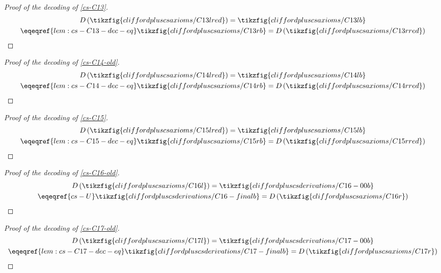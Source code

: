 \begin{proof}[Proof of the decoding of \cref{cs-C13}]
    \begin{gather*}
        D\left(\tikzfig{cliffordpluscsaxioms/C13lred}\right)
        = \tikzfig{cliffordpluscsaxioms/C13lb}\\
        \eqeqref{lem:cs-C13-dec-eq} \tikzfig{cliffordpluscsaxioms/C13rb}
        = D\left(\tikzfig{cliffordpluscsaxioms/C13rred}\right)
    \end{gather*}
\end{proof}

\begin{proof}[Proof of the decoding of \cref{cs-C14-old}]
    \begin{gather*}
        D\left(\tikzfig{cliffordpluscsaxioms/C14lred}\right)
        = \tikzfig{cliffordpluscsaxioms/C14lb}\\
        \eqeqref{lem:cs-C14-dec-eq} \tikzfig{cliffordpluscsaxioms/C14rb}
        = D\left(\tikzfig{cliffordpluscsaxioms/C14rred}\right)
    \end{gather*}
\end{proof}

\begin{proof}[Proof of the decoding of \cref{cs-C15}]
    \begin{gather*}
        D\left(\tikzfig{cliffordpluscsaxioms/C15lred}\right)
        = \tikzfig{cliffordpluscsaxioms/C15lb}\\
        \eqeqref{lem:cs-C15-dec-eq} \tikzfig{cliffordpluscsaxioms/C15rb}
        = D\left(\tikzfig{cliffordpluscsaxioms/C15rred}\right)
    \end{gather*}
\end{proof}

\begin{proof}[Proof of the decoding of \cref{cs-C16-old}]
    \begin{gather*}
        D\left(\tikzfig{cliffordpluscsaxioms/C16l}\right)
        = \tikzfig{cliffordpluscsderivations/C16-00b}\\
        \eqeqref{cs-U} \tikzfig{cliffordpluscsderivations/C16-finalb}
        = D\left(\tikzfig{cliffordpluscsaxioms/C16r}\right)
    \end{gather*}
\end{proof}

\begin{proof}[Proof of the decoding of \cref{cs-C17-old}]
    \begin{gather*}
        D\left(\tikzfig{cliffordpluscsaxioms/C17l}\right)
        = \tikzfig{cliffordpluscsderivations/C17-00b}\\
        \eqeqref{lem:cs-C17-dec-eq} \tikzfig{cliffordpluscsderivations/C17-finalb}
        = D\left(\tikzfig{cliffordpluscsaxioms/C17r}\right)
    \end{gather*}
\end{proof}

